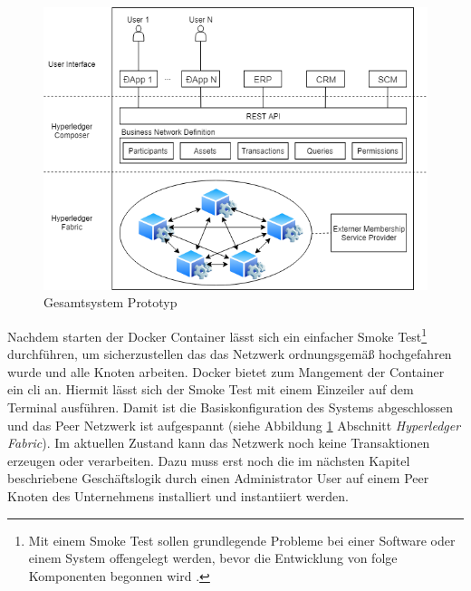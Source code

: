 \begin{figure}[H]
	\centering
	\includegraphics[width=1\linewidth]{pictures/poc-food-chain-traceability}
	\caption[Gesamtsystem Prototyp]{Gesamtsystem Prototyp}
	\label{fig:poc-food-chain-traceability}
\end{figure}

Nachdem starten der Docker Container lässt sich ein einfacher Smoke Test\footnote{Mit einem Smoke Test sollen grundlegende Probleme bei einer Software oder einem System offengelegt werden, bevor die Entwicklung von folge Komponenten begonnen wird \citep{Everett2007}.} durchführen, um sicherzustellen das das Netzwerk ordnungsgemäß hochgefahren wurde und alle Knoten arbeiten. Docker bietet zum Mangement der Container ein \ac{cli} an. Hiermit lässt sich der Smoke Test mit einem Einzeiler auf dem Terminal ausführen. Damit ist die Basiskonfiguration des Systems abgeschlossen und das Peer Netzwerk ist aufgespannt (siehe Abbildung \ref{fig:poc-food-chain-traceability} Abschnitt \textit{Hyperledger Fabric}). Im aktuellen Zustand kann das Netzwerk noch keine Transaktionen erzeugen oder verarbeiten. Dazu muss erst noch die im nächsten Kapitel beschriebene Geschäftslogik durch einen Administrator User auf einem Peer Knoten des Unternehmens installiert und instantiiert werden.

